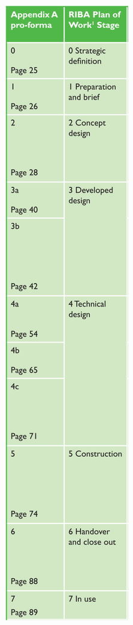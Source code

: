 \begin{figure}[htbp]
	\centering
	\begin{subfigure}[b]{.25\textwidth}
		\centering
		\includegraphics[width=\textwidth]{figures/BG6_RIBAPoW_alignment.png}

\end{subfigure}
\end{figure}
